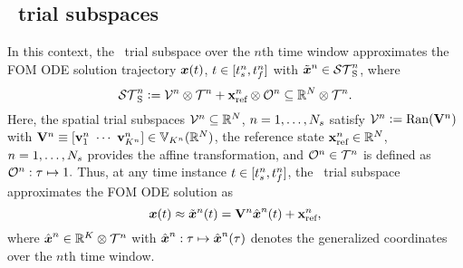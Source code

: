 \subsection{\spatialAcronym\ trial subspaces}
In this context, the \spatialAcronym\ trial subspace over the $n$th time window approximates
the FOM ODE solution trajectory ${\boldsymbol x}(t)$,
$t\in[t_s^{n},t_f^{n}]$ 
with $\tilde{\boldsymbol x}^{n} \in \mathcal{ ST }_{\text{S}}^{n}$, where
\begin{equation}\label{eq:sttrialspace}
 \mathcal{ ST }_{\text{S}}^{n} \vcentcolon= 
	\mathcal{V }^{n} \otimes \mathcal{T}^{n} +
	\mathbf{x}_\text{ref}^{n}\otimes\mathcal{O}^n\subseteq\mathbb{R}^{N} \otimes \mathcal{T}^{n}.
\end{equation}
Here, the spatial trial subspaces $\mathcal{V }^{n}\subseteq\mathbb{R}^{N}$,
$n=1,\ldots,N_s$ satisfy 
$\mathcal{V }^{n}\vcentcolon=\mathrm{Ran}(\mathbf {V}^{n})$ with 
$\basismatArg{n}\equiv[\basisvecArg{n}_1\ \cdots\
\basisvecArg{n}_{\romdimArg{n}}]\in
\RRStar{\romdimArg{n}}{\fomdim}
$, the reference state $\mathbf{x}_\text{ref}^{n} \in \mathbb{R}^{N}$, $n=1,\ldots,N_s$ provides the affine transformation, 
and  
$\mathcal{O}^n\in\mathcal{T}^{n}$ is defined as
$\mathcal{O}^n:\tau\mapsto 1.$
Thus, at any time instance $t\in[t_s^{n},t_f^{n}]$, the
\spatialAcronym\ trial subspace 
approximates the FOM ODE solution as
\begin{equation}\label{eq:affine_trialspace_tclsrm}
	{\boldsymbol x}(t)\approx \tilde{\boldsymbol x}^{n}(t) = \mathbf {V}^{n}
	\hat{ \boldsymbol x}^{n}(t) + \mathbf{x}_\text{ref}^{n},
\end{equation}
where $\hat{ \boldsymbol x}^{n} \in \mathbb{R}^{K} \otimes \mathcal{T}^{n}$ with
$\hat{ \boldsymbol x}^{n}: \tau\mapsto \hat{ \boldsymbol x}^{n}(\tau)
$ denotes the generalized coordinates over the $n$th time window. 

